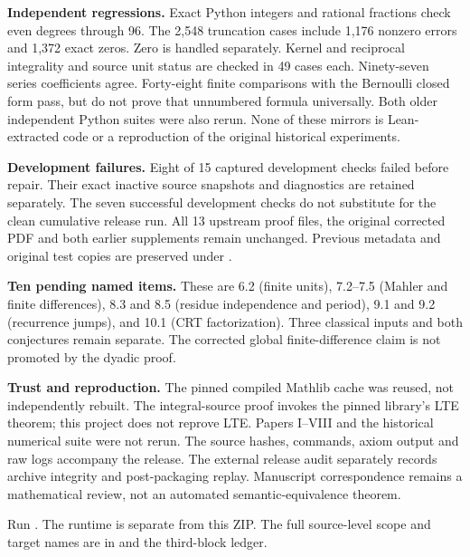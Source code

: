 \textbf{Independent regressions.} Exact Python integers and rational fractions check even degrees through 96. The 2,548 truncation cases include 1,176 nonzero errors and 1,372 exact zeros. Zero is handled separately. Kernel and reciprocal integrality and source unit status are checked in 49 cases each. Ninety-seven series coefficients agree. Forty-eight finite comparisons with the Bernoulli closed form pass, but do not prove that unnumbered formula universally. Both older independent Python suites were also rerun. None of these mirrors is Lean-extracted code or a reproduction of the original historical experiments.

\textbf{Development failures.} Eight of 15 captured development checks failed before repair. Their exact inactive source snapshots and diagnostics are retained separately. The seven successful development checks do not substitute for the clean cumulative release run. All 13 upstream proof files, the original corrected PDF and both earlier supplements remain unchanged. Previous metadata and original test copies are preserved under .

\textbf{Ten pending named items.} These are 6.2 (finite units), 7.2--7.5 (Mahler and finite differences), 8.3 and 8.5 (residue independence and period), 9.1 and 9.2 (recurrence jumps), and 10.1 (CRT factorization). Three classical inputs and both conjectures remain separate. The corrected global finite-difference claim is not promoted by the dyadic proof.

\textbf{Trust and reproduction.} The pinned compiled Mathlib cache was reused, not independently rebuilt. The integral-source proof invokes the pinned library's LTE theorem; this project does not reprove LTE. Papers I--VIII and the historical numerical suite were not rerun. The source hashes, commands, axiom output and raw logs accompany the release. The external release audit separately records archive integrity and post-packaging replay. Manuscript correspondence remains a mathematical review, not an automated semantic-equivalence theorem.

Run . The runtime is separate from this ZIP. The full source-level scope and target names are in  and the third-block ledger.
